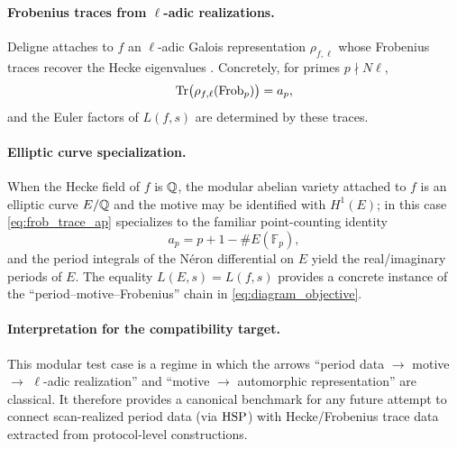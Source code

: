 \paragraph{Frobenius traces from $\ell$-adic realizations.}
Deligne attaches to $f$ an $\ell$-adic Galois representation $\rho_{f,\ell}$ whose Frobenius traces recover the Hecke eigenvalues \cite{Deligne1971Bourbaki,Deligne1974}. Concretely, for primes $p\nmid N\ell$,
\begin{equation}
\label{eq:frob_trace_ap}
\mathrm{Tr}\big(\rho_{f,\ell}(\mathrm{Frob}_p)\big)=a_p,
\end{equation}
and the Euler factors of $L(f,s)$ are determined by these traces.

\paragraph{Elliptic curve specialization.}
When the Hecke field of $f$ is $\mathbb{Q}$, the modular abelian variety attached to $f$ is an elliptic curve $E/\mathbb{Q}$ and the motive may be identified with $H^1(E)$; in this case \eqref{eq:frob_trace_ap} specializes to the familiar point-counting identity
\[
a_p=p+1-\#E(\mathbb{F}_p),
\]
and the period integrals of the N\'eron differential on $E$ yield the real/imaginary periods of $E$. The equality $L(E,s)=L(f,s)$ provides a concrete instance of the ``period--motive--Frobenius'' chain in \eqref{eq:diagram_objective}.

\paragraph{Interpretation for the compatibility target.}
This modular test case is a regime in which the arrows ``period data $\to$ motive $\to$ $\ell$-adic realization'' and ``motive $\to$ automorphic representation'' are classical. It therefore provides a canonical benchmark for any future attempt to connect scan-realized period data (via $\mathrm{HSP}$) with Hecke/Frobenius trace data extracted from protocol-level constructions.


